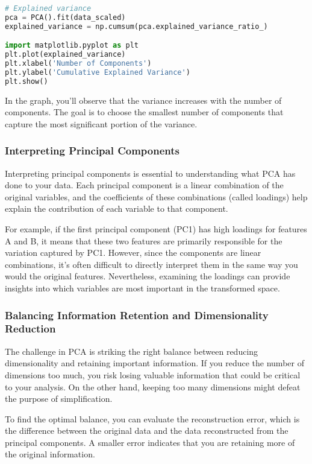 \documentclass{article}
\begin{document}
\begin{lstlisting}[language=Python]
# Explained variance
pca = PCA().fit(data_scaled)
explained_variance = np.cumsum(pca.explained_variance_ratio_)

import matplotlib.pyplot as plt
plt.plot(explained_variance)
plt.xlabel('Number of Components')
plt.ylabel('Cumulative Explained Variance')
plt.show()
\end{lstlisting}

In the graph, you’ll observe that the variance increases with the number of components. The goal is to choose the smallest number of components that capture the most significant portion of the variance.

\subsubsection{Interpreting Principal Components}
Interpreting principal components is essential to understanding what PCA has done to your data. Each principal component is a linear combination of the original variables, and the coefficients of these combinations (called loadings) help explain the contribution of each variable to that component.

For example, if the first principal component (PC1) has high loadings for features A and B, it means that these two features are primarily responsible for the variation captured by PC1. However, since the components are linear combinations, it’s often difficult to directly interpret them in the same way you would the original features. Nevertheless, examining the loadings can provide insights into which variables are most important in the transformed space.

\subsubsection{Balancing Information Retention and Dimensionality Reduction}
The challenge in PCA is striking the right balance between reducing dimensionality and retaining important information. If you reduce the number of dimensions too much, you risk losing valuable information that could be critical to your analysis. On the other hand, keeping too many dimensions might defeat the purpose of simplification.

To find the optimal balance, you can evaluate the reconstruction error, which is the difference between the original data and the data reconstructed from the principal components. A smaller error indicates that you are retaining more of the original information.
\end{document}
